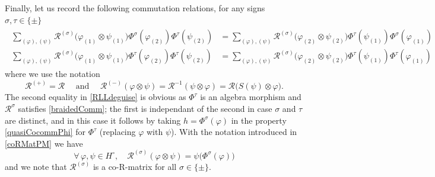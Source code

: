 \documentclass[11pt]{amsart}
\begin{document}
\indent Finally, let us record the following commutation relations, for any signs $\sigma, \tau \in \{\pm\}$ 
\begin{align}
\begin{split}\label{RLLdeguise}
\sum_{(\varphi),(\psi)} \mathcal{R}^{(\sigma)}\bigl( \varphi_{(1)} \otimes \psi_{(1)} \bigr) \Phi^{\sigma}(\varphi_{(2)}) \Phi^\tau(\psi_{(2)}) &=  \sum_{(\varphi),(\psi)} \mathcal{R}^{(\sigma)}\bigl( \varphi_{(2)} \otimes \psi_{(2)} \bigr) \Phi^\tau(\psi_{(1)}) \Phi^{\sigma}(\varphi_{(1)})\\
\sum_{(\varphi),(\psi)} \mathcal{R}^{(\sigma)}\bigl( \varphi_{(1)} \otimes \psi_{(1)} \bigr) \Phi^{\tau}(\varphi_{(2)}) \Phi^\tau(\psi_{(2)}) &=  \sum_{(\varphi),(\psi)} \mathcal{R}^{(\sigma)}\bigl( \varphi_{(2)} \otimes \psi_{(2)} \bigr) \Phi^\tau(\psi_{(1)}) \Phi^{\tau}(\varphi_{(1)})
\end{split}
\end{align}
where we use the notation
\begin{equation}\label{coRMatPM}
\mathcal{R}^{(+)} = \mathcal{R} \quad \text{ and } \quad \mathcal{R}^{(-)}(\varphi \otimes \psi) = \mathcal{R}^{-1}(\psi \otimes \varphi) = \mathcal{R}\bigl(S(\psi) \otimes \varphi\bigr).
\end{equation}
The second equality in \eqref{RLLdeguise} is obvious as $\Phi^\tau$ is an algebra morphism and $\mathcal{R}^{\sigma}$ satisfies \eqref{braidedComm}; the first is independant of the second in case $\sigma$ and $\tau$ are distinct, and in this case it follows by taking $h=\Phi^\sigma(\varphi)$ in the property \eqref{quasiCocommPhi} for $\Phi^\tau$ (replacing $\varphi$ with $\psi$). With the notation introduced in \eqref{coRMatPM} we have
\begin{equation}\label{coRMatSign}
\forall \, \varphi, \psi \in H^\circ, \quad \mathcal{R}^{(\sigma)}(\varphi \otimes \psi) = \psi\bigl( \Phi^{\sigma}(\varphi) \bigr)
\end{equation}
and we note that $\mathcal{R}^{(\sigma)}$ is a co-R-matrix for all $\sigma \in \{\pm\}$. 
\end{document}
